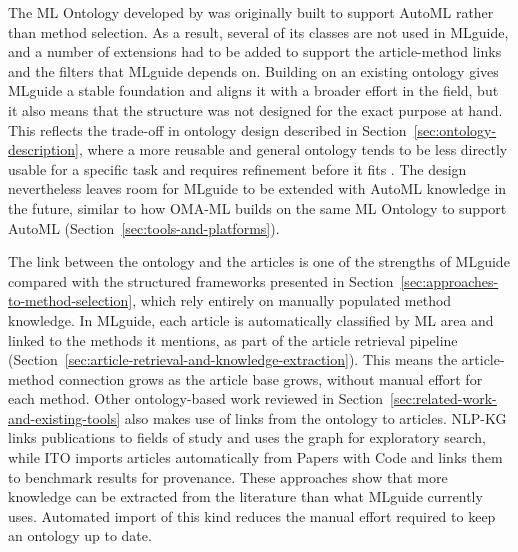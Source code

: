 The ML Ontology developed by \textcite{humm2026industry_ready_machine_learning_ontology} 
was originally built to support AutoML rather 
than method selection. As a result, several of its classes are 
not used in MLguide, and a number of extensions had to be added 
to support the article-method links and the filters that 
MLguide depends on. Building on an existing ontology gives 
MLguide a stable foundation and aligns it with a broader effort 
in the field, but it also means that the structure was not 
designed for the exact purpose at hand.
This reflects the trade-off in ontology design described in 
Section~\ref{sec:ontology-description}, where a more reusable and 
general ontology tends to be less directly usable for a specific 
task and requires refinement before it fits 
\parencite{studer1998knowledge_engineering_principles_methods}. 
The design nevertheless leaves room for MLguide to be 
extended with AutoML knowledge in the future, similar to 
how OMA-ML 
\parencite{zender2022ontology_based_meta_automl} builds on 
the same ML Ontology to support AutoML 
(Section~\ref{sec:tools-and-platforms}).

The link between the ontology and the articles is one of the 
strengths of MLguide compared with the structured frameworks presented
in Section~\ref{sec:approaches-to-method-selection}, which rely 
entirely on manually populated method knowledge. In MLguide, 
each article is automatically classified by ML area and linked 
to the methods it mentions, as part of the article retrieval 
pipeline 
(Section~\ref{sec:article-retrieval-and-knowledge-extraction}). 
This means the article-method connection grows as the article 
base grows, without manual effort for each method. 
Other ontology-based work reviewed in Section~\ref{sec:related-work-and-existing-tools} 
also makes use of links from the 
ontology to articles. NLP-KG \parencite{schopf2024nlp} links 
publications to fields of study and uses the graph for 
exploratory search, while ITO 
\parencite{blagec2022_benchmark_knowledge_graph} imports 
articles automatically from Papers with Code and links them 
to benchmark results for provenance. These approaches show that more knowledge can be extracted from the literature 
than what MLguide currently uses. 
Automated import of this kind reduces the manual effort required 
to keep an ontology up to date.


